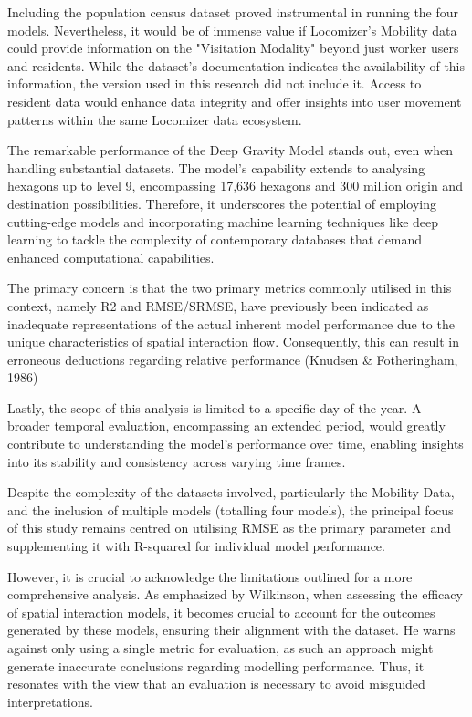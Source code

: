         Including the population census dataset proved instrumental in running the four models. Nevertheless, it would be of immense value if Locomizer's Mobility data could provide information on the "Visitation Modality" beyond just worker users and residents. While the dataset's documentation indicates the availability of this information, the version used in this research did not include it. Access to resident data would enhance data integrity and offer insights into user movement patterns within the same Locomizer data ecosystem.
        
        The remarkable performance of the Deep Gravity Model stands out, even when handling substantial datasets. The model's capability extends to analysing hexagons up to level 9, encompassing 17,636 hexagons and 300 million origin and destination possibilities. Therefore, it underscores the potential of employing cutting-edge models and incorporating machine learning techniques like deep learning to tackle the complexity of contemporary databases that demand enhanced computational capabilities.
        
        The primary concern is that the two primary metrics commonly utilised in this context, namely R2 and RMSE/SRMSE, have previously been indicated as inadequate representations of the actual inherent model performance due to the unique characteristics of spatial interaction flow. Consequently, this can result in erroneous deductions regarding relative performance (Knudsen \& Fotheringham, 1986) \cite{wilkinsonSpatialInteractionModels2023}
        
        Lastly, the scope of this analysis is limited to a specific day of the year. A broader temporal evaluation, encompassing an extended period, would greatly contribute to understanding the model's performance over time, enabling insights into its stability and consistency across varying time frames.

        Despite the complexity of the datasets involved, particularly the Mobility Data, and the inclusion of multiple models (totalling four models), the principal focus of this study remains centred on utilising RMSE as the primary parameter and supplementing it with R-squared for individual model performance.

        However, it is crucial to acknowledge the limitations \cite{wilkinsonSpatialInteractionModels2023} outlined for a more comprehensive analysis. As emphasized by Wilkinson, when assessing the efficacy of spatial interaction models, it becomes crucial to account for the outcomes generated by these models, ensuring their alignment with the dataset. He warns against only using a single metric for evaluation, as such an approach might generate inaccurate conclusions regarding modelling performance. Thus, it resonates with the view that an evaluation is necessary to avoid misguided interpretations.
        
